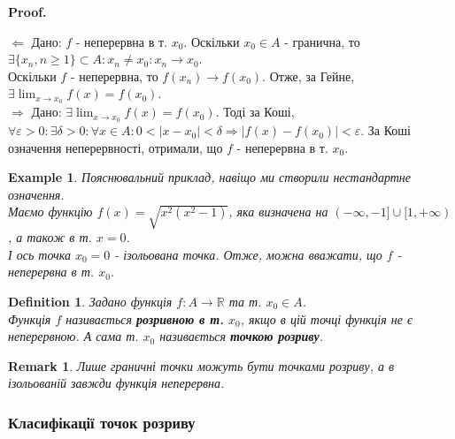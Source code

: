 \documentclass[a4paper, 14pt]{article}
\makeatletter
\def\huge{\displaystyle}
\def\qed{$\blacksquare$}
\def\rightproof{$\boxed{\Rightarrow}$ }
\def\leftproof{$\boxed{\Leftarrow}$ }
\theoremstyle{theoremdd}
\theoremstyle{theoremdd}
\newtheorem{definition}[theorem]{Definition}
\theoremstyle{theoremdd}
\theoremstyle{theoremdd}
\newtheorem{example}[theorem]{Example}
\theoremstyle{theoremdd}
\theoremstyle{theoremdd}
\newtheorem{remark}[theorem]{Remark}
\theoremstyle{theoremdd}
\theoremstyle{theoremdd}
\renewenvironment{proof}[1][Proof.\\]{\par
\pushQED{\hfill \qed}%
\normalfont \topsep6\p@\@plus6\p@\relax
\trivlist
\item\relax
{\bfseries
#1\@addpunct{.}}\hspace\labelsep\ignorespaces
}{%
\popQED\endtrivlist\@endpefalse
}
\makeatother
\begin{document}
\begin{proof}
\leftproof Дано: $f$ - неперервна в т. $x_0$. Оскільки $x_0 \in A$ - гранична, то $\exists \{x_n, n \geq 1\} \subset A: x_n \neq x_0: x_n \to x_0$.\\
Оскільки $f$ - неперервна, то $f(x_n) \to f(x_0)$. Отже, за Гейне, $\exists \huge\lim_{x \to x_0} f(x) = f(x_0)$.
\bigskip \\
\rightproof Дано: $\exists \huge\lim_{x \to x_0} f(x) = f(x_0)$. Тоді за Коші,
$\forall \varepsilon > 0: \exists \delta > 0: \forall x \in A: 0 < |x-x_0| < \delta \Rightarrow |f(x)-f(x_0)| < \varepsilon$.
За Коші означення неперервності, отримали, що $f$ - неперервна в т. $x_0$.
\end{proof}

\begin{example}
Пояснювальний приклад, навіщо ми створили нестандартне означення.\\
Маємо функцію $f(x) = \sqrt{x^2(x^2-1)}$, яка визначена на $(-\infty,-1] \cup [1,+\infty)$, а також в т. $x = 0$.\\
І ось точка $x_0 = 0$ - ізольована точка. Отже, можна вважати, що $f$ - неперервна в т. $x_0$.
\begin{figure}[H]
\centering
{}
\end{figure}
\end{example}

\begin{definition}
Задано функція $f: A \to \mathbb{R}$ та т. $x_0 \in A$.\\
Функція $f$ називається \textbf{розривною в т.} $x_0$, якщо в цій точці функція не є неперервною. А сама т. $x_0$ називається \textbf{точкою розриву}.
\end{definition}

\begin{remark}
Лише граничні точки можуть бути точками розриву, а в ізольованій завжди функція неперервна.
\end{remark}

\subsubsection*{Класифікації точок розриву}
\end{document}
